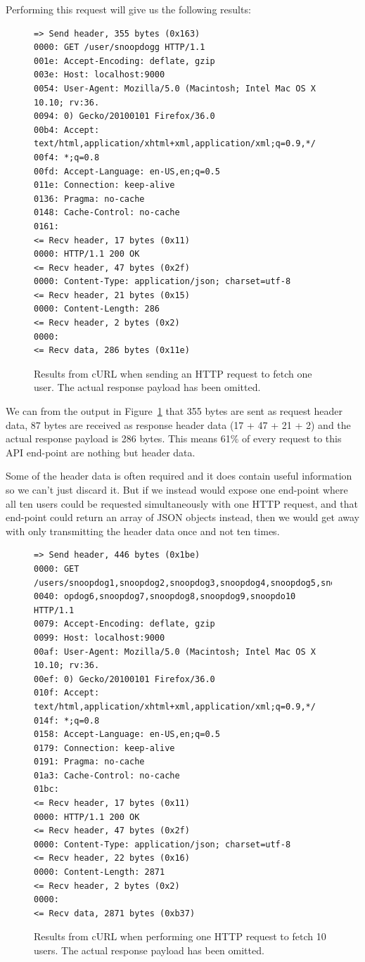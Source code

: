\documentclass{cslthse-msc}
\begin{document}
Performing this request will give us the following results:

\begin{figure}[H]
  \centering
\begin{lstlisting}[breaklines=true]
=> Send header, 355 bytes (0x163)
0000: GET /user/snoopdogg HTTP/1.1
001e: Accept-Encoding: deflate, gzip
003e: Host: localhost:9000
0054: User-Agent: Mozilla/5.0 (Macintosh; Intel Mac OS X 10.10; rv:36.
0094: 0) Gecko/20100101 Firefox/36.0
00b4: Accept: text/html,application/xhtml+xml,application/xml;q=0.9,*/
00f4: *;q=0.8
00fd: Accept-Language: en-US,en;q=0.5
011e: Connection: keep-alive
0136: Pragma: no-cache
0148: Cache-Control: no-cache
0161:
<= Recv header, 17 bytes (0x11)
0000: HTTP/1.1 200 OK
<= Recv header, 47 bytes (0x2f)
0000: Content-Type: application/json; charset=utf-8
<= Recv header, 21 bytes (0x15)
0000: Content-Length: 286
<= Recv header, 2 bytes (0x2)
0000:
<= Recv data, 286 bytes (0x11e)
\end{lstlisting}
  \caption{Results from cURL when sending an HTTP request to fetch one user. The actual response payload has been omitted.}
  \label{fig:headers_overhead}
\end{figure}

We can from the output in Figure~\ref{fig:headers_overhead} that 355 bytes are sent as request header data, 87 bytes are received as response header data (17 + 47 + 21 + 2) and the actual response payload is 286 bytes. This means 61\% of every request to this API end-point are nothing but header data.

Some of the header data is often required and it does contain useful information so we can't just discard it. But if we instead would expose one end-point where all ten users could be requested simultaneously with one HTTP request, and that end-point could return an array of JSON objects instead, then we would get away with only transmitting the header data once and not ten times.

\begin{figure}[H]
  \centering
\begin{lstlisting}[breaklines=true]
=> Send header, 446 bytes (0x1be)
0000: GET /users/snoopdog1,snoopdog2,snoopdog3,snoopdog4,snoopdog5,sno
0040: opdog6,snoopdog7,snoopdog8,snoopdog9,snoopdo10 HTTP/1.1
0079: Accept-Encoding: deflate, gzip
0099: Host: localhost:9000
00af: User-Agent: Mozilla/5.0 (Macintosh; Intel Mac OS X 10.10; rv:36.
00ef: 0) Gecko/20100101 Firefox/36.0
010f: Accept: text/html,application/xhtml+xml,application/xml;q=0.9,*/
014f: *;q=0.8
0158: Accept-Language: en-US,en;q=0.5
0179: Connection: keep-alive
0191: Pragma: no-cache
01a3: Cache-Control: no-cache
01bc:
<= Recv header, 17 bytes (0x11)
0000: HTTP/1.1 200 OK
<= Recv header, 47 bytes (0x2f)
0000: Content-Type: application/json; charset=utf-8
<= Recv header, 22 bytes (0x16)
0000: Content-Length: 2871
<= Recv header, 2 bytes (0x2)
0000:
<= Recv data, 2871 bytes (0xb37)
\end{lstlisting}
  \caption{Results from cURL when performing one HTTP request to fetch 10 users. The actual response payload has been omitted.}
  \label{fig:headers_overhead2}
\end{figure}
\end{document}
